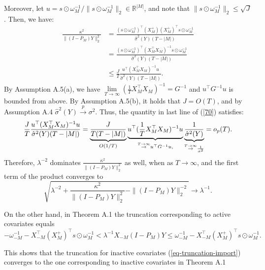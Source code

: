 \documentclass[11pt]{article}
\newcommand{\RR}{\mathbb{R}}
\begin{document}
\begin{enumerate}
		Moreover, let $u=s\odot\omega^{-1}_{M}/\|s\odot\omega^{-1}_{M}\|_2\in\RR^{|M|}$, and note that $\|s\odot\omega^{-1}_{M}\|_2\leq \sqrt{J}$. Then, we have:
		\begin{equation}\label{70}
			\begin{split}
\frac{\kappa^2}{\|(I-P_M)Y\|_2^2}
&=
\frac{(s\odot\omega^{-1}_{M})^\top (X_M^+) (X_M^+)^\top s\odot\omega^{-1}_{M}
}{\hat{\sigma}^2(Y)(T-|M|)}
\\
&=
\frac{(s\odot\omega^{-1}_{M})^\top (X_M^\top X_M)^{-1} s\odot\omega^{-1}_{M}
}{\hat{\sigma}^2(Y)(T-|M|)}\\
&\leq
\frac{J}{T} \frac{u^\top (X_M^\top X_M)^{-1} u}{\hat{\sigma}^2(Y)(T-|M|)} .	\end{split}
		\end{equation}
			By Assumption A.5(a), we have $\lim\limits_{T\to\infty}(\frac{1}{T}X_M^\top X_M)^{-1}=G^{-1}$ and $u^\top G^{-1} u$ is bounded from above. By Assumption A.5(b), it holds that $J=O(T)$, and by Assumption A.4 $\hat{\sigma}^2(Y)\stackrel{p}{\to}\sigma^2$. Thus, the quantity in last line of (\ref{70}) satisfies:
\begin{equation}
	\frac{J}{T} \frac{u^\top (X_M^\top X_M)^{-1} u}{\hat{\sigma}^2(Y)(T-|M|)} =
\underbrace{\frac{J}{T(T-|M|)}}_{O(1/T)}
\underbrace{u^\top (\frac{1}{T}X_M^\top X_M)^{-1} u }_{\stackrel{T\to\infty}{\to} u^\top G^{-1} u, }
\underbrace{\frac{1}{\hat{\sigma}^2(Y)}}_{\stackrel{T\to\infty}{\to}\frac{1}{\sigma^2}}
  = o_p(T).\\
\end{equation}		
Therefore, $\lambda^{-2}$ dominates $\frac{\kappa^2}{\|(I-P_M)Y\|_2^2}
$ as well, when as $T\to\infty$, and the first term of the product converges to
			 \begin{equation}
\sqrt{\lambda^{-2}+\frac{\kappa^2}{\|(I-P_M)Y\|_2^2}-\|(I-P_M)Y\|_2^{-2}}\to\lambda^{-1}.
			 \end{equation}
	
		On the other hand, in Theorem A.1 the truncation corresponding to active covariates equals
		\begin{equation}
			-\omega_{-M}^{-1}-X_{-M}^\top (X_M^+)^\top s\odot \omega_{M}^{-1}<\lambda^{-1}{X_{-M}(I-P_M)Y}
			\leq \omega_{-M}^{-1}-X_{-M}^\top (X_M^+)^\top s\odot \omega_{M}^{-1}.
		\end{equation}
		
		This shows that the truncation for inactive covariates (\ref{eq-truncation-import}) converges to the one corresponding to inactive covariates in Theorem A.1
	\end{enumerate}
	
\end{document}
